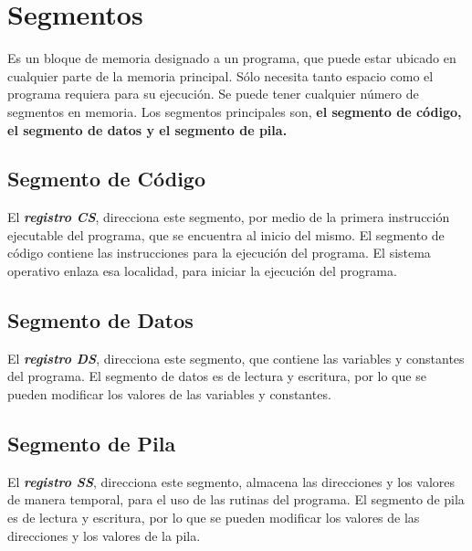 \documentclass{article}
\begin{document}
\section*{Segmentos}
Es un bloque de memoria designado a un programa, que puede estar ubicado
en cualquier parte de la memoria principal. S\'{o}lo necesita tanto espacio
como el programa requiera para su ejecuci\'{o}n. Se puede tener cualquier
n\'{u}mero de segmentos en memoria. Los segmentos principales son, \textbf{el segmento
de c\'{o}digo, el segmento de datos y el segmento de pila.}

\subsection*{Segmento de C\'{o}digo}
El \textbf{\textit{registro CS}}, direcciona este segmento, por medio de la primera instrucci\'{o}n
ejecutable del programa, que se encuentra al inicio del mismo. El segmento de c\'{o}digo
contiene las instrucciones para la ejecuci\'{o}n del programa. El sistema operativo enlaza esa
localidad, para iniciar la ejecuci\'{o}n del programa.

\subsection*{Segmento de Datos}
El \textbf{\textit{registro DS}}, direcciona este segmento, que contiene las variables y constantes
del programa. El segmento de datos es de lectura y escritura, por lo que se pueden modificar los
valores de las variables y constantes.

\subsection*{Segmento de Pila}
El \textbf{\textit{registro SS}}, direcciona este segmento, almacena las direcciones y los valores
de manera temporal, para el uso de las rutinas del programa. El segmento de pila es de lectura y
escritura, por lo que se pueden modificar los valores de las direcciones y los valores de la pila.
\end{document}
